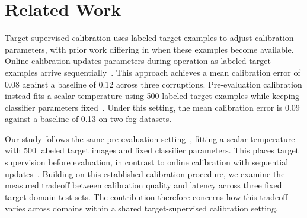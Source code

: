\section{Related Work}

Target-supervised calibration uses labeled target examples to adjust calibration parameters, with prior work differing in when these examples become available. Online calibration updates parameters during operation as labeled target examples arrive sequentially~\cite{chen2024online}. This approach achieves a mean calibration error of 0.08 against a baseline of 0.12 across three corruptions. Pre-evaluation calibration instead fits a scalar temperature using 500 labeled target examples while keeping classifier parameters fixed~\cite{rao2025frozen}. Under this setting, the mean calibration error is 0.09 against a baseline of 0.13 on two fog datasets.

Our study follows the same pre-evaluation setting~\cite{rao2025frozen}, fitting a scalar temperature with 500 labeled target images and fixed classifier parameters. This places target supervision before evaluation, in contrast to online calibration with sequential updates~\cite{chen2024online}. Building on this established calibration procedure, we examine the measured tradeoff between calibration quality and latency across three fixed target-domain test sets. The contribution therefore concerns how this tradeoff varies across domains within a shared target-supervised calibration setting.
